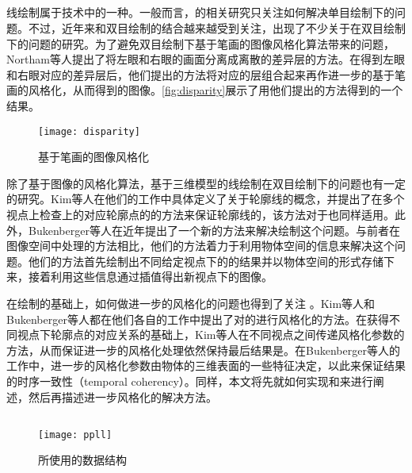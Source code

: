 \subsection{\stc{}\npr{}}

线绘制属于\npr{}技术中的一种。一般而言，\npr{}的相关研究只关注如何解决单目绘制下的问题。不过，近年来\npr{}和双目绘制的结合越来越受到关注，出现了不少关于\npr{}在双目绘制下的问题的研究。为了避免双目绘制下基于笔画的图像风格化算法\cite{hertzmann1998painterly}带来的问题，Northam等人\cite{northam2012consistent,northam2013stereoscopic}提出了将左眼和右眼的画面分离成离散的差异层的方法。在得到左眼和右眼对应的差异层后，他们提出的方法将对应的层组合起来再作进一步的基于笔画的风格化，从而得到\stc{}的图像。\autoref{fig:disparity}展示了用他们提出的方法得到的一个结果。

\begin{figure}[tbh]
    \centering
    \texttt{[image: disparity]}
    \caption[\stc{}基于笔画的图像风格化]{\label{fig:disparity}
    \stc{}基于笔画的图像风格化\cite{northam2012consistent}}
\end{figure}

除了基于图像的风格化算法，基于三维模型的线绘制在双目绘制下的问题也有一定的研究。Kim等人在他们的工作中具体定义了关于轮廓线的\stc{}概念，并提出了在多个视点上检查\ec{}上的对应轮廓点的的方法来保证轮廓线的\stcy{}，该方法对于\scon{}也同样适用。此外，Bukenberger等人在近年提出了一个新的方法\cite{bukenberger2018stereo}来解决\stc{}\con{}绘制这个问题。与前者在图像空间中处理的方法相比，他们的方法着力于利用物体空间的信息来解决这个问题。他们的方法首先绘制出不同给定视点下的\con{}的结果并以物体空间的形式存储下来，接着利用这些信息通过插值得出新视点下\stc{}\con{}的图像。

在\stc{}\con{}绘制的基础上，如何做进一步的风格化的问题也得到了关注\cite{northrup2000artistic,kalnins2003coherent} 。Kim等人和Bukenberger等人都在他们各自的工作中提出了对\stc{}的\con{}进行风格化的方法。在获得不同视点下轮廓点的对应关系的基础上，Kim等人在不同视点之间传递风格化参数的方法，从而保证进一步的风格化处理依然保持最后结果是\stc{}。在Bukenberger等人的工作中，进一步的风格化参数由物体的三维表面的一些特征决定，以此来保证结果的时序一致性（temporal coherency）。同样，本文将先就如何实现\stc{}\con{}和\scon{}来进行阐述，然后再描述进一步风格化的解决方法。

\subsection{\ppll{}}

\begin{figure}[tbh]
    \centering
    \texttt{[image: ppll]}
    \caption[\ppll{}所使用的数据结构]{\label{fig:ppll}
    \ppll{}所使用的数据结构\cite{yang2010real}}
\end{figure}

